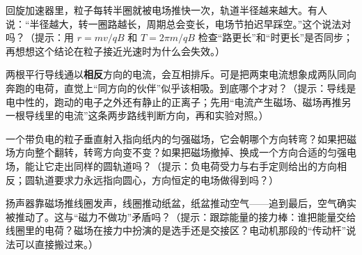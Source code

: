 \begin{puzzles}
  \item 回旋加速器里，粒子每转半圈就被电场推快一次，轨道半径越来越大。有人说：“半径越大，转一圈路越长，周期总会变长，电场节拍迟早踩空。”这个说法对吗？（提示：用 \(r=mv/qB\) 和 \(T=2\pi m/qB\) 检查“路更长”和“时更长”是否同步；再想想这个结论在粒子接近光速时为什么会失效。）
  \item 两根平行导线通以\textbf{相反}方向的电流，会互相排斥。可是把两束电流想象成两队同向奔跑的电荷，直觉上“同方向的伙伴”似乎该相吸。到底哪个才对？（提示：导线是电中性的，跑动的电子之外还有静止的正离子；先用“电流产生磁场、磁场再推另一根导线里的电流”这条两步路线判断方向，再和实验对照。）
  \item 一个带负电的粒子垂直射入指向纸内的匀强磁场，它会朝哪个方向转弯？如果把磁场方向整个翻转，转弯方向变不变？如果把磁场撤掉、换成一个方向合适的匀强电场，能让它走出同样的圆轨道吗？（提示：负电荷受力与右手定则给出的方向相反；圆轨道要求力永远指向圆心，方向恒定的电场做得到吗？）
  \item 扬声器靠磁场推线圈发声，线圈推动纸盆，纸盆推动空气——追到最后，空气确实被推动了。这与“磁力不做功”矛盾吗？（提示：跟踪能量的接力棒：谁把能量交给线圈里的电荷？磁场在接力中扮演的是选手还是交接区？电动机那段的“传动杆”说法可以直接搬过来。）
\end{puzzles}

